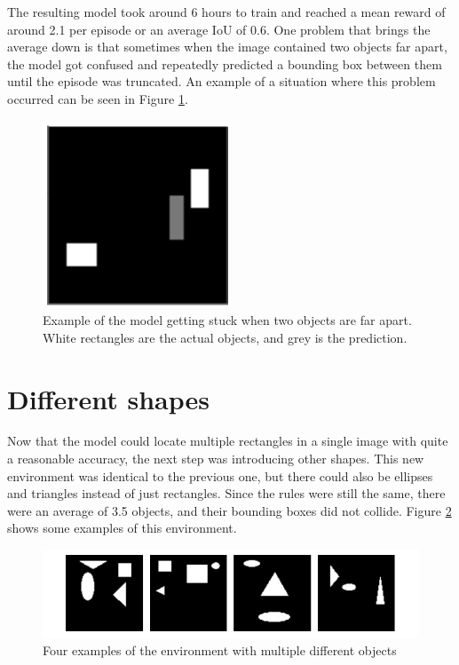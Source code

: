 \documentclass[
  digital,     %
  oneside,     %
  nosansbold,  %
  nocolorbold, %
  lof,         %
  lot,         %
]{fithesis4}
\begin{document}
The resulting model took around 6 hours to train and reached a mean reward of around 2.1 per episode or an average IoU of 0.6. One problem that brings the average down is that sometimes when the image contained two objects far apart, the model got confused and repeatedly predicted a bounding box between them until the episode was truncated. An example of a situation where this problem occurred can be seen in Figure \ref{fig:v3_stuck}.

\begin{figure}
    \centering
    \includegraphics[width=0.5\linewidth]{results/v3_stuck.png}
    \caption{Example of the model getting stuck when two objects are far apart. White rectangles are the actual objects, and grey is the prediction.}
    \label{fig:v3_stuck}
\end{figure}

\section{Different shapes}
Now that the model could locate multiple rectangles in a single image with quite a reasonable accuracy, the next step was introducing other shapes. This new environment was identical to the previous one, but there could also be ellipses and triangles instead of just rectangles. Since the rules were still the same, there were an average of 3.5 objects, and their bounding boxes did not collide. Figure \ref{fig:env4} shows some examples of this environment.

\begin{figure}
    \includegraphics[width=1\linewidth]{env_examples/env4.pdf}
    \caption{Four examples of the environment with multiple different objects}
    \label{fig:env4}
\end{figure}
 
\end{document}
